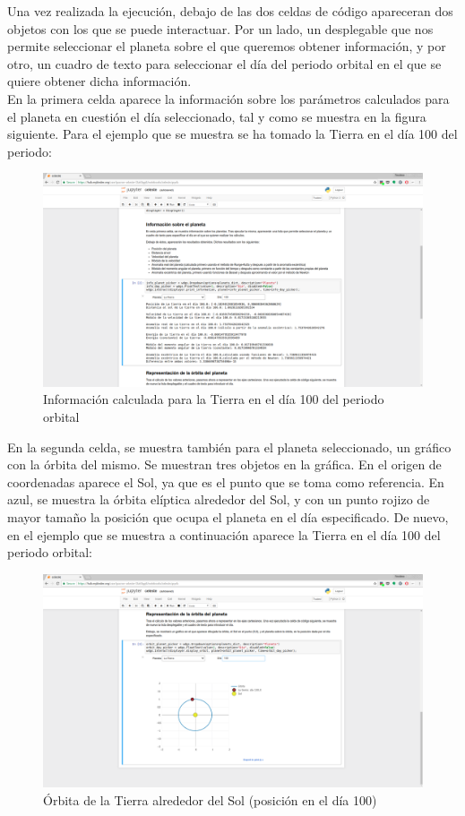 \documentclass[12pt]{article}
\begin{document}
Una vez realizada la ejecución, debajo de las dos celdas de código apareceran
dos objetos con los que se puede interactuar. Por un lado, un desplegable
que nos permite seleccionar el planeta sobre el que queremos obtener información,
y por otro, un cuadro de texto para seleccionar el día del periodo orbital en
el que se quiere obtener dicha información.\\

En la primera celda aparece la información sobre los parámetros calculados
para el planeta en cuestión el día seleccionado, tal y como se muestra en 
la figura siguiente. Para el ejemplo que se muestra se ha tomado la Tierra
en el día 100 del periodo:

\begin{figure}[H]
  \centering
  \includegraphics[width=.9\textwidth]{imgs/earth_information}
  \caption{Información calculada para la Tierra en el día 100 del periodo orbital}
\end{figure}

En la segunda celda, se muestra también para el planeta seleccionado, un
gráfico con la órbita del mismo. Se muestran tres objetos en la gráfica.
En el origen de coordenadas aparece el Sol, ya que es el punto que se
toma como referencia. En azul, se muestra la órbita elíptica alrededor
del Sol, y con un punto rojizo de mayor tamaño la posición que ocupa
el planeta en el día especificado. De nuevo, en el ejemplo que se
muestra a continuación aparece la Tierra en el día 100 del periodo
orbital:

\begin{figure}[H]
  \centering
  \includegraphics[width=.9\textwidth]{imgs/earth_orbit}
  \caption{Órbita de la Tierra alrededor del Sol (posición en el día 100)}
\end{figure}
\end{document}
